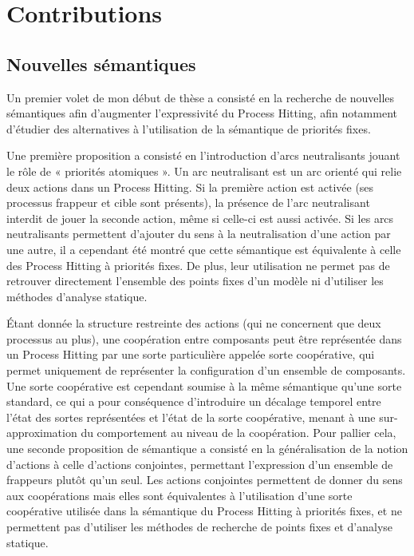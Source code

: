 \chapter{Contributions}


\section{Nouvelles sémantiques}
Un premier volet de mon début de thèse a consisté en la recherche de nouvelles sémantiques afin d'augmenter l'expressivité du Process Hitting, afin notamment d'étudier des alternatives à l'utilisation de la sémantique de priorités fixes.

Une première proposition a consisté en l'introduction d'arcs neutralisants jouant le rôle de « priorités atomiques ».
Un arc neutralisant est un arc orienté qui relie deux actions dans un Process Hitting.
Si la première action est activée (\ie ses processus frappeur et cible sont présents), la présence de l'arc neutralisant interdit de jouer la seconde action, même si celle-ci est aussi activée.
Si les arcs neutralisants permettent d'ajouter du sens à la neutralisation d'une action par une autre, il a cependant été montré que cette sémantique est équivalente à celle des Process Hitting à priorités fixes.
De plus, leur utilisation ne permet pas de retrouver directement l'ensemble des points fixes d'un modèle ni d'utiliser les méthodes d'analyse statique.


Étant donnée la structure restreinte des actions (qui ne concernent que deux processus au plus), une coopération entre composants peut être représentée dans un Process Hitting par une sorte particulière appelée sorte coopérative, qui permet uniquement de représenter la configuration d'un ensemble de composants.
Une sorte coopérative est cependant soumise à la même sémantique qu'une sorte standard, ce qui a pour conséquence d'introduire un décalage temporel entre l'état des sortes représentées et l'état de la sorte coopérative, menant à une sur-approximation du comportement au niveau de la coopération.
Pour pallier cela, une seconde proposition de sémantique a consisté en la généralisation de la notion d'actions à celle d'actions conjointes, permettant l'expression d'un ensemble de frappeurs plutôt qu'un seul.
Les actions conjointes permettent de donner du sens aux coopérations mais elles sont équivalentes à l'utilisation d'une sorte coopérative utilisée dans la sémantique du Process Hitting à priorités fixes, et ne permettent pas d'utiliser les méthodes de recherche de points fixes et d'analyse statique.

